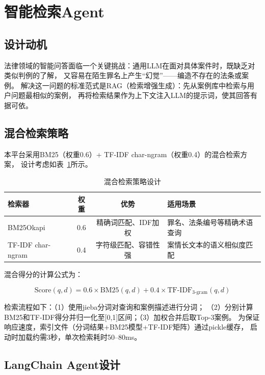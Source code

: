 \documentclass[12pt,a4paper,twoside]{ctexart}
\begin{document}
\section{智能检索Agent}

\subsection{设计动机}

法律领域的智能问答面临一个关键挑战：通用LLM在面对具体案件时，既缺乏对类似判例的了解，
又容易在陌生罪名上产生``幻觉''——编造不存在的法条或案例。
解决这一问题的标准范式是RAG（检索增强生成）：先从案例库中检索与用户问题最相似的案例，
再将检索结果作为上下文注入LLM的提示词，使其回答有据可依\cite{lewis2020}。

\subsection{混合检索策略}

本平台采用BM25（权重0.6）+ TF-IDF char-ngram（权重0.4）的混合检索方案，
设计考虑如表~\ref{tab:hybrid_retrieval}所示。

\begin{table}[H]
\centering
\caption{混合检索策略设计}
\label{tab:hybrid_retrieval}
\begin{tabular}{@{}lccp{6cm}@{}}
\toprule
\textbf{检索器} & \textbf{权重} & \textbf{优势} & \textbf{适用场景} \\
\midrule
BM25Okapi       & 0.6  & 精确词匹配、IDF加权      & 罪名、法条编号等精确术语查询 \\
TF-IDF char-ngram & 0.4 & 字符级匹配、容错性强     & 案情长文本的语义相似度匹配   \\
\bottomrule
\end{tabular}
\end{table}

混合得分的计算公式为：

\begin{equation}
\text{Score}(q, d) = 0.6 \times \text{BM25}(q, d) + 0.4 \times \text{TF-IDF}_{3\text{-gram}}(q, d)
\end{equation}

检索流程如下：（1）使用jieba分词对查询和案例描述进行分词；
（2）分别计算BM25和TF-IDF得分并归一化至[0,1]区间；（3）加权合并后取Top-3案例。
为保证响应速度，索引文件（分词结果+BM25模型+TF-IDF矩阵）通过pickle缓存，
启动时加载约需3秒，单次检索耗时50--80ms。

\subsection{LangChain Agent设计}
\end{document}
